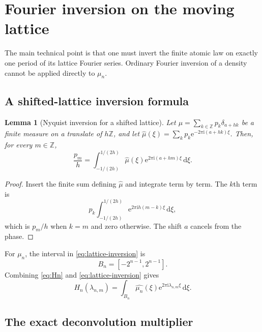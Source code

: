 \documentclass[11pt,oneside]{article}
\newtheorem{lemma}[theorem]{Lemma}
\theoremstyle{definition}
\theoremstyle{remark}
\newcommand{\Z}{\mathbb Z}
\newcommand{\e}{\mathrm e}
\newcommand{\ii}{\mathrm i}
\newcommand{\dd}{\,\mathrm d}
\begin{document}
\section{Fourier inversion on the moving lattice}
\label{sec:fourier}

The main technical point is that one must invert the finite atomic law on exactly one period
of its lattice Fourier series.  Ordinary Fourier inversion of a density cannot be applied
directly to $\mu_n$.

\subsection{A shifted-lattice inversion formula}

\begin{lemma}[Nyquist inversion for a shifted lattice]
\label{lem:lattice-inversion}
Let $\mu=\sum_{k\in\Z}p_k\delta_{a+hk}$ be a finite measure on a translate of $h\Z$, and let
$\widehat\mu(\xi)=\sum_kp_k\e^{-2\pi\ii(a+hk)\xi}$.  Then, for every $m\in\Z$,
\begin{equation}
 \frac{p_m}{h}
 =\int_{-1/(2h)}^{1/(2h)}
   \widehat\mu(\xi)\e^{2\pi\ii(a+hm)\xi}\dd\xi.          \label{eq:lattice-inversion}
\end{equation}
\end{lemma}

\begin{proof}
Insert the finite sum defining $\widehat\mu$ and integrate term by term.  The $k$th term is
\[
 p_k\int_{-1/(2h)}^{1/(2h)}\e^{2\pi\ii h(m-k)\xi}\dd\xi,
\]
which is $p_m/h$ when $k=m$ and zero otherwise.  The shift $a$ cancels from the phase.
\end{proof}

For $\mu_n$, the interval in \eqref{eq:lattice-inversion} is
\begin{equation}
 B_n=[-2^{n-1},2^{n-1}].                                   \label{eq:Bn}
\end{equation}
Combining \eqref{eq:Hn} and \eqref{eq:lattice-inversion} gives
\begin{equation}
 H_n(\lambda_{n,m})
 =\int_{B_n}\widehat{\mu_n}(\xi)
   \e^{2\pi\ii\lambda_{n,m}\xi}\dd\xi.                  \label{eq:Hn-inversion}
\end{equation}

\subsection{The exact deconvolution multiplier}
\end{document}
